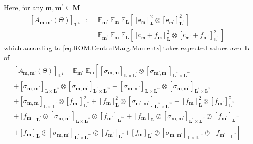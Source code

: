 \documentclass[preprint,12pt]{elsarticle}
\newcommand*{\M}[1]{\ensuremath{#1}\xspace}
\newcommand*{\x}{\times}
\newcommand*{\mi}[1]{\mathbf{#1}}
\newcommand*{\rv}[1]{\mathsf{#1}}
\newcommand*{\te}[2][]{\left\lbrack{#2}\right\rbrack_{#1}}
\newcommand*{\deq}{\M{\mathrel{\mathop:}=}}
\newcommand*{\ev}[3][]{\mathbb{E}_{#3}^{#1}\!\left\lbrack{#2}\right\rbrack}
\newcommand*{\evt}[3][]{\mathbb{E}_{#3}^{#1}\!#2}
\begin{document}
        Here, for any $\mi{m},\mi{m^{\prime}}\subseteq\mi{M}$
        \begin{equation*}
            \begin{aligned}
                \te[\mi{L^4}]{A_{\mi{m},\mi{m^{\prime}}}(\Theta)}
                &\deq \evt{\;\evt{\;\ev{\te[\mi{L}]{\rv{e_{m}}}^{2} \otimes \te[\mi{L^{\prime\prime}}]{\rv{e_{m^{\prime}}}}^{2}}{\mi{L}}}{\mi{m}}}{\mi{m^{\prime}}} \\
                &\phantom{:}= \evt{\;\evt{\;\ev{\te[\mi{L}]{\rv{c_{m}}+f_{\mi{m}}}^{2} \otimes \te[\mi{L^{\prime\prime}}]{\rv{c_{m^{\prime}}}+ f_{\mi{m^{\prime}}}}^{2}}{\mi{L}}}{\mi{m}}}{\mi{m^{\prime}}}  
            \end{aligned}
        \end{equation*}
        which according to \cref{eq:ROM:CentralMarg:Moments} takes expected values over $\mi{L}$ of
        \begin{multline*}
            \te[\mi{L^4}]{A_{\mi{m},\mi{m^{\prime}}}(\Theta)} 
            = \evt{\;\evt{\left\lbrack
            \te[\mi{L\x L^{\prime}}]{\sigma_{\mi{m,m}}} \otimes \te[\mi{L^{\prime\prime}\x L^{\prime\prime\prime}}]{\sigma_{\mi{m^{\prime},m^{\prime}}}}\right. \\
            +\te[\mi{L\x L^{\prime\prime}}]{\sigma_{\mi{m,m^{\prime}}}} \otimes \te[\mi{L^{\prime}\x L^{\prime\prime\prime}}]{\sigma_{\mi{m,m^{\prime}}}}
            +\te[\mi{L\x L^{\prime\prime\prime}}]{\sigma_{\mi{m,m^{\prime}}}} \otimes \te[\mi{L^{\prime}\x L^{\prime\prime}}]{\sigma_{\mi{m,m^{\prime}}}} \\
            + \te[\mi{L\x L^{\prime}}]{\sigma_{\mi{m,m}}} \otimes \te[\mi{L^{\prime\prime}}]{f_{\mi{m^{\prime}}}}^{2} 
            + \te[\mi{L}]{f_{\mi{m}}}^{2} \otimes \te[\mi{L^{\prime\prime}\x L^{\prime\prime\prime}}]{\sigma_{\mi{m^{\prime},m^{\prime}}}}
            + \te[\mi{L}]{f_{\mi{m}}}^{2} \otimes \te[\mi{L^{\prime\prime}}]{f_{\mi{m^{\prime}}}}^{2} \\
            +\te[\mi{L^{\prime}}]{f_{\mi{m}}} \oslash \te[\mi{L\x L^{\prime\prime}}]{\sigma_{\mi{m,m^{\prime}}}} \oslash \te[\mi{L^{\prime\prime\prime}}]{f_{\mi{m^{\prime}}}}
            +\te[\mi{L}]{f_{\mi{m}}} \oslash \te[\mi{L^{\prime}\x L^{\prime\prime}}]{\sigma_{\mi{m,m^{\prime}}}} \oslash \te[\mi{L^{\prime\prime\prime}}]{f_{\mi{m^{\prime}}}}\\
            +\te[\mi{L}]{f_{\mi{m}}} \oslash \te[\mi{L^{\prime}\x L^{\prime\prime\prime}}]{\sigma_{\mi{m,m^{\prime}}}} \oslash \te[\mi{L^{\prime\prime}}]{f_{\mi{m^{\prime}}}}
            \left. +\te[\mi{L^{\prime}}]{f_{\mi{m}}} \oslash \te[\mi{L\x L^{\prime\prime\prime}}]{\sigma_{\mi{m,m^{\prime}}}} \oslash \te[\mi{L^{\prime\prime}}]{f_{\mi{m^{\prime}}}}
            \right\rbrack}{\mi{m}}}{\mi{m^{\prime}}} 
        \end{multline*}
\end{document}

